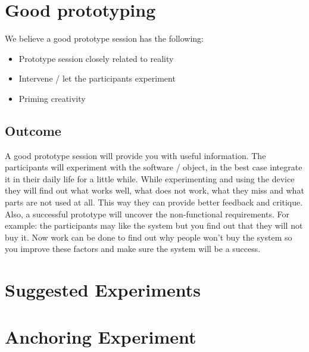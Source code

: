 \documentclass{article}
\begin{document}
\section{Good prototyping}
We believe a good prototype session has the following:

\begin{itemize}
\item Prototype session closely related to reality
\item Intervene / let the participants experiment
\item Priming creativity 
\end{itemize}
 
\subsection{Outcome}
A good prototype session will provide you with useful information. The participants
will experiment with the software / object, in the best case integrate it in their
daily life for a little while. While experimenting and using the device they will
find out what works well, what does not work, what they miss and what parts
are not used at all. This way they can provide better feedback and critique.
Also, a successful prototype will uncover the non-functional requirements.
For example: the participants may like the system but you find out that they will not
buy it. Now work can be done to find out why people won't buy the system so you improve these factors and  make sure the system will be a success.


\section{Suggested Experiments}



\section{Anchoring Experiment}


\end{document}

